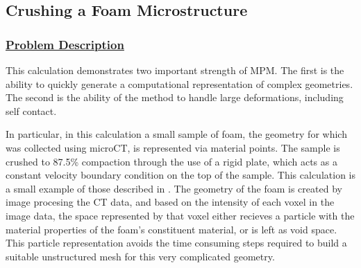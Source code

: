 \subsection*{\center Crushing a Foam Microstructure}
\subsubsection*{\underline{Problem Description}}
This calculation demonstrates two important strength of MPM.  The first
is the ability to quickly generate a computational representation of
complex geometries.  The second is the ability of the method to handle
large deformations, including self contact.

In particular, in this calculation a small sample of foam, the geometry
for which was collected using microCT, is represented via material points.
The sample is crushed to 87.5\% compaction through the use of a rigid plate, which
acts as a constant velocity boundary condition on the top of the sample.  This
calculation is a small example of those described in \cite{brydonfoam}.  The
geometry of the foam is created by image procesing the CT data, and based
on the intensity of each voxel in the image data, the space represented
by that voxel either recieves a particle with the material properties of the
foam's constituent material, or is left as void space.  This particle
representation avoids the time consuming steps required to build a suitable
unstructured mesh for this very complicated geometry.
 
